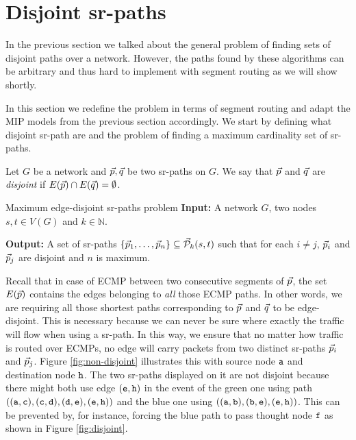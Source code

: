 \section{Disjoint sr-paths}
\label{section:dpsr}

In the previous section we talked about the general problem of finding sets of disjoint paths over a network.
However, the paths found by these algorithms can be arbitrary and thus hard to implement with segment 
routing as we will show shortly.

In this section we redefine the problem in terms of segment routing and adapt the MIP models from
the previous section accordingly. We start by defining what disjoint sr-path are and the problem of finding
a maximum cardinality set of sr-paths.

\begin{definition}
Let $G$ be a network and $\vec{p}, \vec{q}$ be two sr-paths on $G$. We say that $\vec{p}$ and $\vec{q}$ are \emph{disjoint} if
$E(\vec{p}) \cap E(\vec{q}) = \emptyset$. 
\end{definition}

\begin{problem}{Maximum edge-disjoint sr-paths problem}
\label{prob:max-sr-edp}
\textbf{Input:} A network $G$, two nodes $s, t \in V(G)$ and $k \in \mathbb{N}$.

\textbf{Output:} A set of sr-paths $\{ \vec{p}_1, \ldots, \vec{p}_n \} \subseteq \mathcal{\vec{P}}_k(s, t)$ such that for each $i \neq j$, $\vec{p}_i$ and $\vec{p}_j$
are disjoint and $n$ is maximum.
\end{problem}

Recall that in case of ECMP between two consecutive segments of $\vec{p}$, the set $E(\vec{p})$ contains the edges belonging to \emph{all} 
those ECMP paths. In other words, we are requiring all those shortest paths corresponding to $\vec{p}$ and $\vec{q}$ to be edge-disjoint.
This is necessary because we can never be sure where exactly the traffic will flow when using a sr-path. In this way, we ensure that no matter how traffic is routed
over ECMPs, no edge will carry packets from two distinct sr-paths $\vec{p}_i$ and $\vec{p}_j$. Figure \ref{fig:non-disjoint} illustrates this with source node $\texttt{a}$
and destination node $\texttt{h}$. The two sr-paths displayed
on it are not disjoint because there might both use edge $(\texttt{e}, \texttt{h})$ in the event of the green one using path 
$((\texttt{a}, \texttt{c}), (\texttt{c}, \texttt{d}), (\texttt{d}, \texttt{e}), (\texttt{e}, \texttt{h}))$ and the blue one using $((\texttt{a}, \texttt{b}), (\texttt{b}, \texttt{e}), (\texttt{e}, \texttt{h}))$.
This can be prevented by, for instance, forcing the blue path to pass thought node $\texttt{f}$ as shown in Figure \ref{fig:disjoint}.

